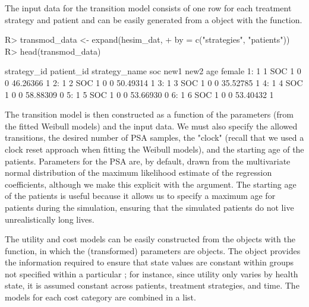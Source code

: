 \documentclass[article, nojss]{jss}\usepackage[]{graphicx}\usepackage[]{color}
\begin{document}
The input data for the transition model consists of one row for each treatment strategy and patient and can be easily generated from a  object with the  function.

\begin{Schunk}
\begin{Sinput}
R> transmod_data <- expand(hesim_dat,
+                          by = c("strategies", "patients"))
R> head(transmod_data)
\end{Sinput}
\begin{Soutput}
   strategy_id patient_id strategy_name soc new1 new2      age female
1:           1          1           SOC   1    0    0 46.26366      1
2:           1          2           SOC   1    0    0 50.49314      1
3:           1          3           SOC   1    0    0 35.52785      1
4:           1          4           SOC   1    0    0 58.88309      0
5:           1          5           SOC   1    0    0 53.66930      0
6:           1          6           SOC   1    0    0 53.40432      1
\end{Soutput}
\end{Schunk}

The transition model is then constructed as a function of the parameters (from the fitted Weibull models) and the input data. We must also specify the allowed transitions, the desired number of PSA samples, the "clock" (recall that we used a clock reset approach when fitting the Weibull models), and the starting age of the patients. Parameters for the PSA are, by default, drawn from the multivariate normal distribution of the maximum likelihood estimate of the regression coefficients, although we make this explicit with the  argument. The starting age of the patients is useful because it allows us to specify a maximum age for patients during the simulation, ensuring that the simulated patients do not live unrealistically long lives. 

\begin{Schunk}
\end{Schunk}

The utility and cost models can be easily constructed from the  objects with the  function, in which the (transformed) parameters are  objects. The  object provides the information required to ensure that state values are constant within groups not specified within a particular ; for instance, since utility only varies by health state, it is assumed constant across patients, treatment strategies, and time. The models for each cost category are combined in a list.
  
\end{document}

